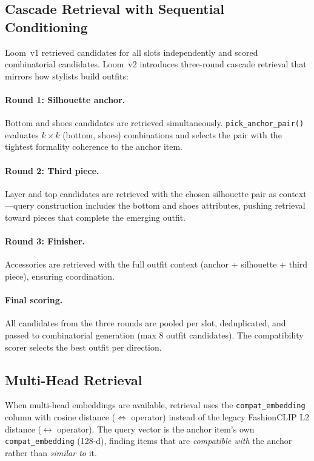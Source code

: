 \documentclass[10pt,twocolumn]{article}
\begin{document}
\subsection{Cascade Retrieval with Sequential Conditioning}
\label{sec:cascade}

Loom~v1 retrieved candidates for all slots independently and scored
combinatorial candidates.  Loom~v2 introduces three-round cascade
retrieval that mirrors how stylists build outfits:

\paragraph{Round 1: Silhouette anchor.}
Bottom and shoes candidates are retrieved simultaneously.
\texttt{pick\_anchor\_pair()} evaluates $k{\times}k$ (bottom, shoes)
combinations and selects the pair with the tightest formality
coherence to the anchor item.

\paragraph{Round 2: Third piece.}
Layer and top candidates are retrieved with the chosen silhouette
pair as context---query construction includes the bottom and shoes
attributes, pushing retrieval toward pieces that complete the
emerging outfit.

\paragraph{Round 3: Finisher.}
Accessories are retrieved with the full outfit context
(anchor + silhouette + third piece), ensuring coordination.

\paragraph{Final scoring.}
All candidates from the three rounds are pooled per slot, deduplicated,
and passed to combinatorial generation (max 8 outfit candidates).  The
compatibility scorer selects the best outfit per direction.

\subsection{Multi-Head Retrieval}
\label{sec:mh_retrieval}

When multi-head embeddings are available, retrieval uses the
\texttt{compat\_embedding} column with cosine distance ($\Leftrightarrow$
operator) instead of the legacy FashionCLIP L2 distance ($\leftrightarrow$
operator).  The query vector is the anchor item's own
\texttt{compat\_embedding} (128-d), finding items that are
\emph{compatible with} the anchor rather than \emph{similar to} it.
\end{document}
